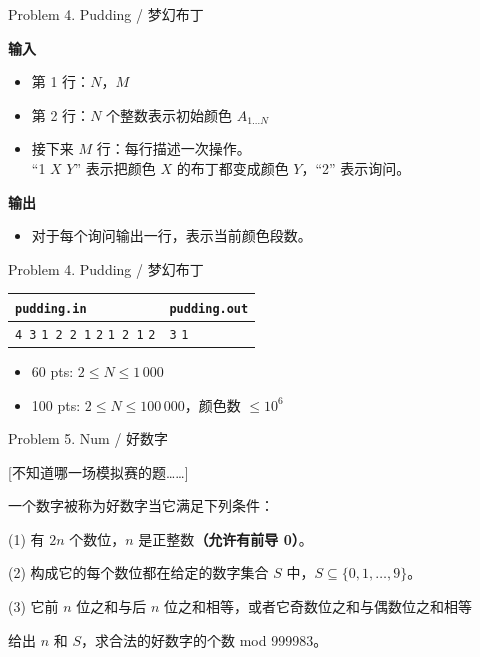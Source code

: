 \documentclass[UTF8]{beamer}
\begin{document}
\begin{frame}{Problem 4. Pudding / 梦幻布丁}

\textbf{输入}
\begin{itemize}
    \item 第 1 行：$N$，$M$
    \item 第 2 行：$N$ 个整数表示初始颜色 $A_{1 \dots N}$
    \item 接下来 $M$ 行：每行描述一次操作。 \\ “1 $X$ $Y$” 表示把颜色 $X$ 的布丁都变成颜色 $Y$，“2” 表示询问。
\end{itemize}
\textbf{输出}
\begin{itemize}
    \item 对于每个询问输出一行，表示当前颜色段数。
\end{itemize}

\end{frame}

\begin{frame}{Problem 4. Pudding / 梦幻布丁}

\begin{tabularx}{\textwidth}{|X|X|}
\hline
\texttt{\textbf{pudding.in}} & \texttt{\textbf{pudding.out}} \\ \hline
\texttt{4 3}\newline
\texttt{1 2 2 1}\newline
\texttt{2}\newline
\texttt{1 2 1}\newline
\texttt{2}
&
\texttt{3}\newline
\texttt{1}
\\ \hline
\end{tabularx}
\newline
\begin{itemize}
    \item 60 pts: $2 \leq N \leq 1\,000$
    \item 100 pts: $2 \leq N \leq 100\,000$，颜色数 $\leq 10^6$
\end{itemize}

\end{frame}


\begin{frame}{Problem 5. Num / 好数字}

[不知道哪一场模拟赛的题……]

一个数字被称为好数字当它满足下列条件：

(1) 有 $2n$ 个数位，$n$ 是正整数\textbf{（允许有前导 0）}。

(2) 构成它的每个数位都在给定的数字集合 $S$ 中，$S \subseteq \{0,1,\dots,9\}$。

(3) 它前 $n$ 位之和与后 $n$ 位之和相等，或者它奇数位之和与偶数位之和相等

给出 $n$ 和 $S$，求合法的好数字的个数 mod 999983。

\end{frame}
\end{document}
